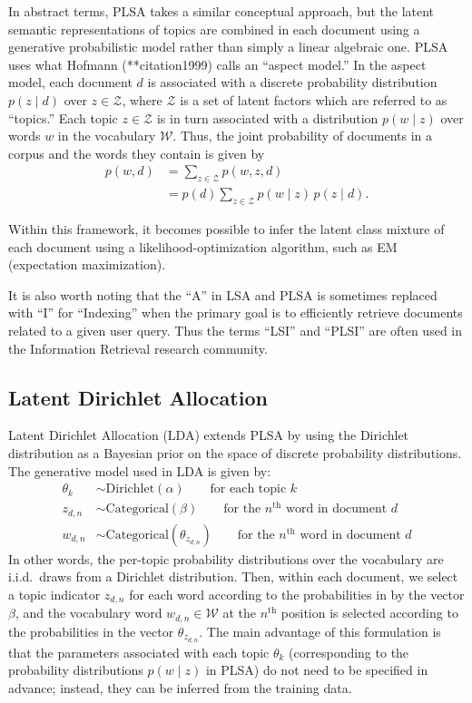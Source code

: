 \documentclass{article}
\newcommand{\nth}{^{\text{th}}}
\begin{document}
In abstract terms, PLSA takes a similar conceptual approach, but the latent semantic representations of topics are combined in each document using a generative probabilistic model rather than simply a linear algebraic one.
PLSA uses what Hofmann (**citation1999) calls an ``aspect model.''
In the aspect model, each document $d$ is associated with a discrete probability distribution $p(z \mid d)$ over $z \in \mathcal Z$, where $\mathcal Z$ is a set of latent factors which are referred to as ``topics.''
Each topic $z \in \mathcal Z$ is in turn associated with a distribution $p(w \mid z)$ over words $w$ in the vocabulary $\mathcal W$.
Thus, the joint probability of documents in a corpus and the words they contain is given by
\begin{align*}
p(w, d)
&= \sum_{z \in \mathcal Z} p(w, z, d) \\
&= p(d) \sum_{z \in \mathcal Z} p(w \mid z) \, p(z \mid d).
\end{align*}

Within this framework, it becomes possible to infer the latent class mixture of each document using a likelihood-optimization algorithm, such as EM (expectation maximization).

It is also worth noting that the ``A'' in LSA and PLSA is sometimes replaced with ``I'' for ``Indexing'' when the primary goal is to efficiently retrieve documents related to a given user query.
Thus the terms ``LSI'' and ``PLSI'' are often used in the Information Retrieval research community.

\subsection{Latent Dirichlet Allocation}

Latent Dirichlet Allocation (LDA) extends PLSA by using the Dirichlet distribution as a Bayesian prior on the space of discrete probability distributions.
The generative model used in LDA is given by:
\begin{align*}
\theta_k &\sim \text{Dirichlet}(\alpha) \qquad \text{for each topic $k$} \\
z_{d,n} &\sim \text{Categorical}(\beta) \qquad \text{for the $n\nth$ word in document $d$} \\
w_{d,n} &\sim \text{Categorical}(\theta_{z_{d,n}}) \qquad \text{for the $n\nth$ word in document $d$}
\end{align*}
In other words, the per-topic probability distributions over the vocabulary are i.i.d.\ draws from a Dirichlet distribution.
Then, within each document, we select a topic indicator $z_{d,n}$ for each word according to the probabilities in by the vector $\beta$, and the vocabulary word $w_{d,n} \in \mathcal W$ at the $n\nth$ position is selected according to the probabilities in the vector $\theta_{z_{d,n}}$.
The main advantage of this formulation is that the parameters associated with each topic $\theta_k$ (corresponding to the probability distributions $p(w \mid z)$ in PLSA) do not need to be specified in advance;
instead, they can be inferred from the training data.
\end{document}

